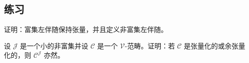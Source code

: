 \subsection*{练习}

\begin{exercise}\label{ex:enriched-left-adjoints-preserve-tensors}
证明：富集左伴随保持张量，并且定义非富集左伴随。
\end{exercise}

\begin{exercise}\label{ex:tensored-diagram-category}
设 $\mathcal{J}$ 是一个小的非富集\trCategory{}并设 $\mathcal{C}$ 是一个
$\mathcal{V}$-范畴。证明：若 $\mathcal{C}$ 是张量化的或余张量化的，则
$\mathcal{C}^{\mathcal{J}}$ 亦然。
\end{exercise}

